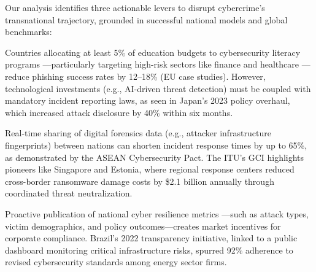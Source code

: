 Our analysis identifies three actionable levers to disrupt cybercrime's transnational trajectory,
grounded in successful national models and global benchmarks:

Countries allocating at least 5\% of education budgets to cybersecurity literacy programs
—particularly targeting high-risk sectors like finance and healthcare
—reduce phishing success rates by 12--18\% (EU case studies).
However, technological investments (e.g., AI-driven threat detection)
must be coupled with mandatory incident reporting laws,
as seen in Japan’s 2023 policy overhaul, which increased attack disclosure by 40\% within six months.

Real-time sharing of digital forensics data (e.g., attacker infrastructure fingerprints)
between nations can shorten incident response times by up to 65\%,
as demonstrated by the ASEAN Cybersecurity Pact.
The ITU’s GCI highlights pioneers like Singapore and Estonia,
where regional response centers reduced cross-border ransomware damage
costs by \$2.1 billion annually through coordinated threat neutralization.

Proactive publication of national cyber resilience metrics
—such as attack types, victim demographics, and policy outcomes—creates market incentives for corporate compliance.
Brazil’s 2022 transparency initiative, linked to a public dashboard monitoring critical infrastructure risks,
spurred 92\% adherence to revised cybersecurity standards among energy sector firms.
